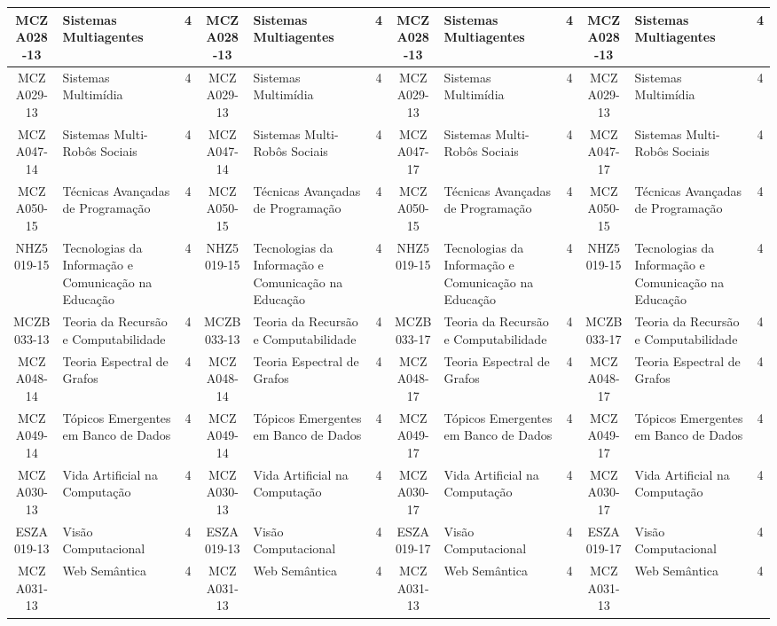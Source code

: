 \begin{landscape}
{\begin{longtable}{|c|p{.2\textheight}|c||c|p{.2\textheight}|c||c|p{.2\textheight}|c||c|p{.2\textheight}|c|}
MCZA028-13 & Sistemas Multiagentes & 4 &
MCZA028-13 & Sistemas Multiagentes & 4 &
MCZA028-13 & Sistemas Multiagentes & 4 &
MCZA028-13 & Sistemas Multiagentes & 4\\ \hline

MCZA029-13 & Sistemas Multimídia & 4 &
MCZA029-13 & Sistemas Multimídia & 4 &
MCZA029-13 & Sistemas Multimídia & 4 &
MCZA029-13 & Sistemas Multimídia & 4\\ \hline

MCZA047-14 & Sistemas Multi-Robôs Sociais & 4 &
MCZA047-14 & Sistemas Multi-Robôs Sociais & 4 &
MCZA047-17 & Sistemas Multi-Robôs Sociais & 4 &
MCZA047-17 & Sistemas Multi-Robôs Sociais & 4\\ \hline

MCZA050-15 & Técnicas Avançadas de Programação & 4 &
MCZA050-15 & Técnicas Avançadas de Programação & 4 &
MCZA050-15 & Técnicas Avançadas de Programação & 4 &
MCZA050-15 & Técnicas Avançadas de Programação & 4\\ \hline

NHZ5019-15 & Tecnologias da Informação e Comunicação na Educação & 4 &
NHZ5019-15 & Tecnologias da Informação e Comunicação na Educação & 4 &
NHZ5019-15 & Tecnologias da Informação e Comunicação na Educação & 4 &
NHZ5019-15 & Tecnologias da Informação e Comunicação na Educação & 4\\ \hline

MCZB033-13 & Teoria da Recursão e Computabilidade & 4 &
MCZB033-13 & Teoria da Recursão e Computabilidade & 4 &
MCZB033-17 & Teoria da Recursão e Computabilidade & 4 &
MCZB033-17 & Teoria da Recursão e Computabilidade & 4\\ \hline

MCZA048-14 & Teoria Espectral de Grafos & 4 &
MCZA048-14 & Teoria Espectral de Grafos & 4 &
MCZA048-17 & Teoria Espectral de Grafos & 4 &
MCZA048-17 & Teoria Espectral de Grafos & 4\\ \hline

MCZA049-14 & Tópicos Emergentes em Banco de Dados & 4 &
MCZA049-14 & Tópicos Emergentes em Banco de Dados & 4 &
MCZA049-17 & Tópicos Emergentes em Banco de Dados & 4 &
MCZA049-17 & Tópicos Emergentes em Banco de Dados & 4\\ \hline

MCZA030-13 & Vida Artificial na Computação & 4 &
MCZA030-13 & Vida Artificial na Computação & 4 &
MCZA030-17 & Vida Artificial na Computação & 4 &
MCZA030-17 & Vida Artificial na Computação & 4\\ \hline

ESZA019-13 & Visão Computacional & 4 &
ESZA019-13 & Visão Computacional & 4 &
ESZA019-17 & Visão Computacional & 4 &
ESZA019-17 & Visão Computacional & 4\\ \hline

MCZA031-13 & Web Semântica & 4 &
MCZA031-13 & Web Semântica & 4 &
MCZA031-13 & Web Semântica & 4 &
MCZA031-13 & Web Semântica & 4\\ \hline
    
\end{longtable}
}
\end{landscape}
